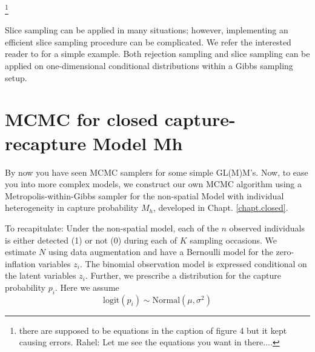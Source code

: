 \footnote{there are supposed to be equations in the caption of figure
4 but it kept causing errors. Rahel: Let me see the equations you want
in there....}

Slice sampling can be applied in many situations; however,
implementing an efficient slice sampling procedure can be
complicated. We refer the interested reader to 
\citet[][Chapt. 7]{robert_casella:2010} for a simple example.  Both rejection
sampling and slice sampling can be applied on one-dimensional
conditional distributions within a Gibbs sampling setup.

\section{MCMC for closed capture-recapture Model Mh}

By now you have seen MCMC samplers for some simple GL(M)M's. Now, to
ease you into more complex models, we construct our own MCMC algorithm
using a Metropolis-within-Gibbs sampler for the non-spatial Model with
individual heterogeneity in capture probability $M_{h}$, developed in
Chapt. \ref{chapt.closed}.

To recapitulate: Under the non-spatial model, each of the $n$ observed
individuals is either detected (1) or not (0) during each of $K$
sampling occasions. We estimate $N$ using data augmentation and have a
Bernoulli model for the zero-inflation variables $z_{i}$. The binomial
observation model is expressed conditional on the latent variables
$z_{i}$. Further, we prescribe a distribution for the capture
probability $p_{i}$. Here we assume
\[
\mathrm{logit}(p_{i}) \sim \mbox{Normal}(\mu,\sigma^2)
\]

